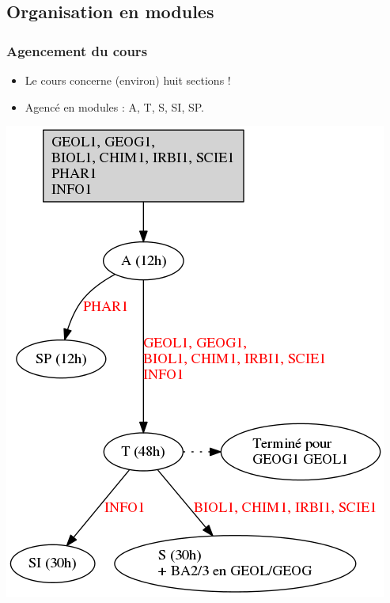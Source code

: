 \documentclass[french,xcolor=svgnames]{beamer}
\begin{document}



\subsection{Organisation en modules}
\begin{frame}
  \frametitle{Agencement du cours}
  \begin{minipage}{0.4\textwidth}
    \begin{itemize}
    \item Le cours concerne (environ) huit sections !

    \item Agencé en modules : A, T, S, SI, SP.
    \end{itemize}
  \end{minipage}
  \begin{minipage}{0.4\textwidth}
    \includegraphics[width=\textwidth]{112-organisation-avec-anet-alt}
  \end{minipage}
\end{frame}
\end{document}
